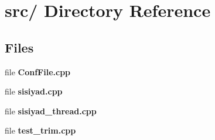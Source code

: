 \section{src/ Directory Reference}
\label{dir_000001}
\subsection*{Files}
\begin{CompactItemize}
\item 
file {\bf ConfFile.cpp}
\item 
file {\bf sisiyad.cpp}
\item 
file {\bf sisiyad_thread.cpp}
\item 
file {\bf test_trim.cpp}
\end{CompactItemize}
